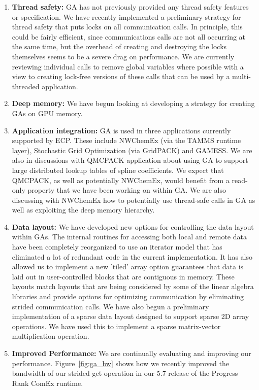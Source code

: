 \begin{enumerate}
\item \textbf{Thread safety:} GA has not previously provided any thread safety
features or specification. We have recently implemented a preliminary strategy
for thread safety that puts locks on all communication calls. In principle, this
could be fairly efficient, since communications calls are not all occurring at
the same time, but the overhead of creating and destroying the locks themselves
seems to be a severe drag on performance. We are currently reviewing individual
calls to remove global variables where possible with a view to creating
lock-free versions of these calls that can be used by a multi-threaded
application.

\item \textbf{Deep memory:} We have begun looking at developing a strategy for
creating GAs on GPU memory.

\item \textbf{Application integration:} GA is used in three applications
currently supported by ECP. These include NWChemEx (via the TAMMS runtime layer),
Stochastic Grid Optimization (via GridPACK) and GAMESS. We are also in discussions
with QMCPACK application about using GA to support large distributed lookup tables
of spline coefficients. We expect that QMCPACK, as well as potentially NWChemEx,
would benefit from a read-only property that we have been working on within GA.
We are also discussing with NWChemEx how to potentially use thread-safe calls in
GA as well as exploiting the deep memory hierarchy.

\item \textbf{Data layout:} We have developed new options for controlling the
data layout within GAs. The internal routines for accessing both local and
remote data have been completely reorganized to use an iterator model that has
eliminated a lot of redundant code in the current implementation. It has also
allowed us to implement a new 'tiled' array option guarantees that data is laid
out in user-controlled blocks that are contiguous in memory. These layouts match
layouts that are being considered by some of the linear algebra libraries and
provide options for optimizing communication by eliminating strided
communication calls. We have also begun a preliminary implementation of a
sparse data layout designed to support sparse 2D array operations. We have used
this to implement a sparse matrix-vector multiplication operation.

\item \textbf{Improved Performance:} We are continually evaluating and
improving our performance. Figure~\ref{fig:ga_bw} shows how we recently
improved the bandwidth of our strided get operation in our 5.7 release
of the Progress Rank ComEx runtime\cite{xGA_COMEX}.
\end{enumerate}

